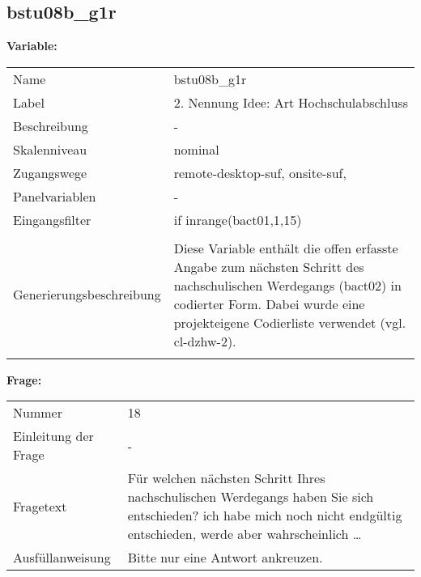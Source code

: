	
	
	\subsection{bstu08b\_g1r}
	\label{subSection:bstu08b_g1r}

	\noindent\textbf{Variable:}\\
		\begin{tabular}{lL{11.3cm}}
			\label{tableVariable:bstu08b_g1r}
			Name & bstu08b\_g1r \\
			Label & 2. Nennung Idee: Art Hochschulabschluss \\
			Beschreibung & - \\
			Skalenniveau & nominal \\
			Zugangswege &
				remote-desktop-suf,
				onsite-suf,
 \\
			Panelvariablen & -
			 \\
			Eingangsfilter & if inrange(bact01,1,15) \\
 \\
					Generierungsbeschreibung & Diese Variable enthält die offen erfasste Angabe zum nächsten Schritt des nachschulischen Werdegangs (bact02) in codierter Form. Dabei wurde eine projekteigene Codierliste verwendet (vgl. cl-dzhw-2).
				 \\	
			 \\
		\end{tabular}

		\vspace*{1 cm}
		\noindent\textbf{Frage:}\\
		\begin{tabular}{lL{11.3cm}}
			\label{tableQuestion:bstu08b_g1r}
			Nummer & 18 \\
			Einleitung der Frage & - \\
			Fragetext & Für welchen nächsten Schritt Ihres nachschulischen Werdegangs haben Sie sich entschieden?
ich habe mich noch nicht endgültig entschieden, werde aber wahrscheinlich … \\
			Ausfüllanweisung & Bitte nur eine Antwort ankreuzen. \\
		\end{tabular}





